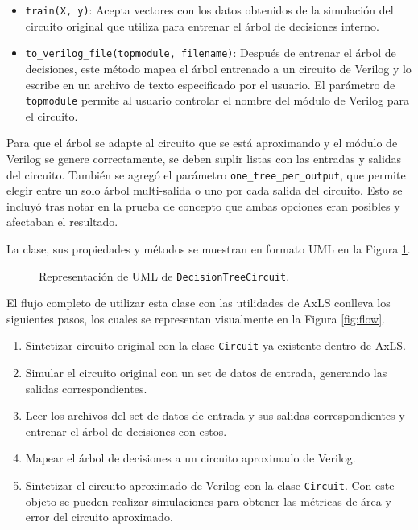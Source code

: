 \begin{itemize}
  \item \texttt{train(X, y)}: Acepta vectores con los datos obtenidos de la
    simulación del circuito original que utiliza para entrenar el árbol de
    decisiones interno.
  \item \texttt{to\_verilog\_file(topmodule, filename)}: Después de entrenar el
    árbol de decisiones, este método mapea el árbol entrenado a un circuito de
    Verilog y lo escribe en un archivo de texto especificado por el usuario. El
    parámetro de \texttt{topmodule} permite al usuario controlar el nombre del
    módulo de Verilog para el circuito.
\end{itemize}

Para que el árbol se adapte al circuito que se está aproximando y el módulo de
Verilog se genere correctamente, se deben suplir listas con las entradas y
salidas del circuito.
También se agregó el parámetro \texttt{one\_tree\_per\_output}, que permite
elegir entre un solo árbol multi-salida o uno por cada salida del circuito.
Esto se incluyó tras notar en la prueba de concepto que ambas opciones eran
posibles y afectaban el resultado.

La clase, sus propiedades y métodos se muestran en formato UML en la Figura
\ref{fig:UML}.

\begin{figure}[htb]
  \centering
  
  \caption{Representación de UML de \texttt{DecisionTreeCircuit}.}
  \label{fig:UML}
\end{figure}

El flujo completo de utilizar esta clase con las utilidades de AxLS conlleva los siguientes pasos, los cuales se representan visualmente en la Figura \ref{fig:flow}.

\begin{enumerate}
  \item Sintetizar circuito original con la clase \texttt{Circuit} ya existente dentro de AxLS.
  \item Simular el circuito original con un set de datos de entrada, generando las salidas correspondientes.
  \item Leer los archivos del set de datos de entrada y sus salidas correspondientes y entrenar el árbol de decisiones con estos.
  \item Mapear el árbol de decisiones a un circuito aproximado de Verilog.
  \item Sintetizar el circuito aproximado de Verilog con la clase \texttt{Circuit}. Con este objeto se pueden realizar simulaciones para obtener las métricas de área y error del circuito aproximado.
\end{enumerate}

